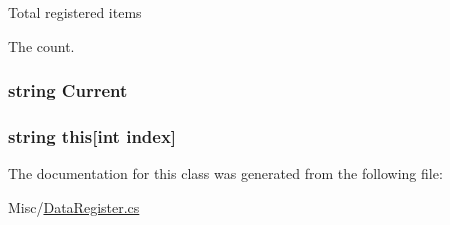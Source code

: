 Total registered items 

The count.\hypertarget{classOTA_1_1Misc_1_1DataRegister_ac1ecbacad011388594d776ae8043553d}{}
\subsubsection[{Current}]{\setlength{\rightskip}{0pt plus 5cm}string Current\hspace{0.3cm}{\ttfamily [get]}}\label{classOTA_1_1Misc_1_1DataRegister_ac1ecbacad011388594d776ae8043553d}
\hypertarget{classOTA_1_1Misc_1_1DataRegister_ac296626b7fb007c1d6674f5ddce5b3c6}{}
\subsubsection[{this[int index]}]{\setlength{\rightskip}{0pt plus 5cm}string this\mbox{[}int index\mbox{]}\hspace{0.3cm}{\ttfamily [get]}}\label{classOTA_1_1Misc_1_1DataRegister_ac296626b7fb007c1d6674f5ddce5b3c6}


The documentation for this class was generated from the following file\+:\begin{DoxyCompactItemize}
\item 
Misc/\hyperlink{DataRegister_8cs}{Data\+Register.\+cs}\end{DoxyCompactItemize}

